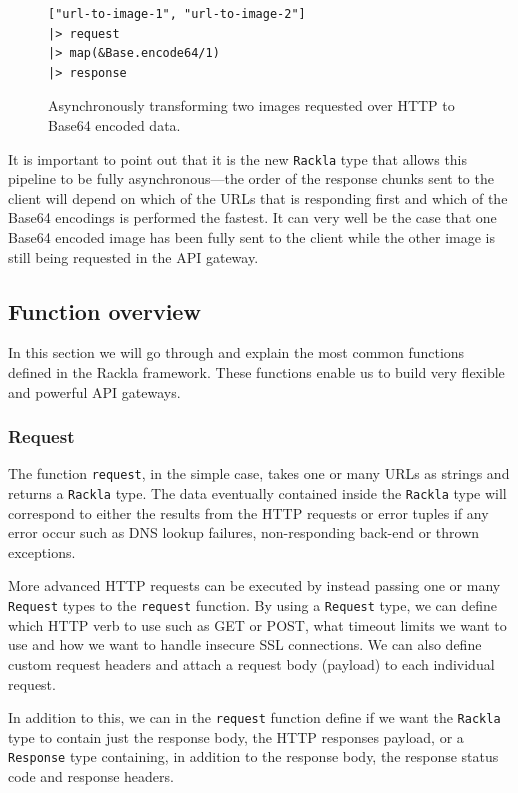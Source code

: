 \documentclass{cslthse-msc}
\begin{document}
\begin{figure}[H]
  \centering
\begin{lstlisting}[breaklines=true,frame=single]
["url-to-image-1", "url-to-image-2"]
|> request
|> map(&Base.encode64/1)
|> response
\end{lstlisting}
  \caption{Asynchronously transforming two images requested over HTTP to Base64 encoded data.}
    \label{fig:map}
\end{figure}

It is important to point out that it is the new \lstinline{Rackla} type that allows this pipeline to be fully asynchronous---the order of the response chunks sent to the client will depend on which of the URLs that is responding first and which of the Base64 encodings is performed the fastest. It can very well be the case that one Base64 encoded image has been fully sent to the client while the other image is still being requested in the API gateway.

\subsection{Function overview}
In this section we will go through and explain the most common functions defined in the Rackla framework. These functions enable us to build very flexible and powerful API gateways.

\subsubsection{Request}
The function \lstinline{request}, in the simple case, takes one or many URLs as strings and returns a \lstinline{Rackla} type. The data eventually contained inside the \lstinline{Rackla} type will correspond to either the results from the HTTP requests or error tuples if any error occur such as DNS lookup failures, non-responding back-end or thrown exceptions.

More advanced HTTP requests can be executed by instead passing one or many \lstinline{Request} types to the \lstinline{request} function. By using a \lstinline{Request} type, we can define which HTTP verb to use such as GET or POST, what timeout limits we want to use and how we want to handle insecure SSL connections. We can also define custom request headers and attach a request body (payload) to each individual request.

In addition to this, we can in the \lstinline{request} function define if we want the \lstinline{Rackla} type to contain just the response body, the HTTP responses payload, or a \lstinline{Response} type containing, in addition to the response body, the response status code and response headers.
\end{document}
